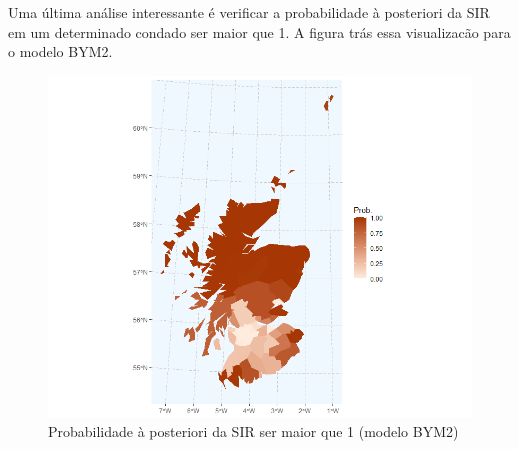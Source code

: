 Uma última análise interessante é verificar a probabilidade à posteriori da SIR em um determinado condado ser maior que 1. A figura trás essa visualizacão para o modelo BYM2.

\begin{figure}[h]
    \centering
    \includegraphics[width = 0.8\linewidth]{images/prob_greater_1.png}
    \caption{Probabilidade à posteriori da SIR ser maior que 1 (modelo BYM2)}
    \label{fig:my_label}
\end{figure}
